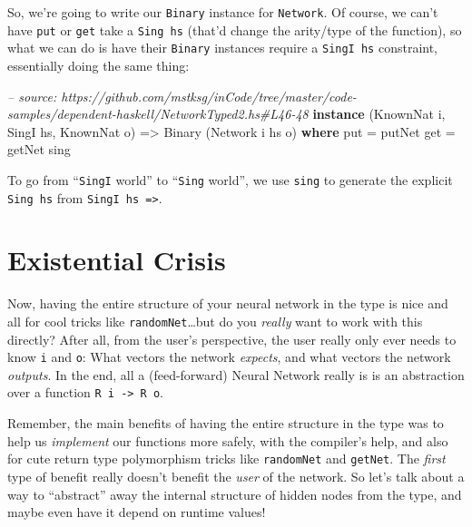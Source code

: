 \documentclass[]{article}
\newenvironment{Shaded}{}{}
\newcommand{\KeywordTok}[1]{\textcolor[rgb]{0.00,0.44,0.13}{\textbf{{#1}}}}
\newcommand{\DataTypeTok}[1]{\textcolor[rgb]{0.56,0.13,0.00}{{#1}}}
\newcommand{\CommentTok}[1]{\textcolor[rgb]{0.38,0.63,0.69}{\textit{{#1}}}}
\newcommand{\OtherTok}[1]{\textcolor[rgb]{0.00,0.44,0.13}{{#1}}}
\newcommand{\FunctionTok}[1]{\textcolor[rgb]{0.02,0.16,0.49}{{#1}}}
\newcommand{\NormalTok}[1]{{#1}}
\begin{document}
So, we're going to write our \texttt{Binary} instance for \texttt{Network}. Of
course, we can't have \texttt{put} or \texttt{get} take a \texttt{Sing\ hs}
(that'd change the arity/type of the function), so what we can do is have their
\texttt{Binary} instances require a \texttt{SingI\ hs} constraint, essentially
doing the same thing:

\begin{Shaded}
\begin{Highlighting}[]
\CommentTok{-- source: https://github.com/mstksg/inCode/tree/master/code-samples/dependent-haskell/NetworkTyped2.hs#L46-48}
\KeywordTok{instance} \NormalTok{(}\DataTypeTok{KnownNat} \NormalTok{i, }\DataTypeTok{SingI} \NormalTok{hs, }\DataTypeTok{KnownNat} \NormalTok{o) }\OtherTok{=>} \DataTypeTok{Binary} \NormalTok{(}\DataTypeTok{Network} \NormalTok{i hs o) }\KeywordTok{where}
    \NormalTok{put }\FunctionTok{=} \NormalTok{putNet}
    \NormalTok{get }\FunctionTok{=} \NormalTok{getNet sing}
\end{Highlighting}
\end{Shaded}

To go from ``\texttt{SingI} world'' to ``\texttt{Sing} world'', we use
\texttt{sing} to generate the explicit \texttt{Sing\ hs} from
\texttt{SingI\ hs\ =\textgreater{}}.

\section{Existential Crisis}\label{existential-crisis}

Now, having the entire structure of your neural network in the type is nice and
all for cool tricks like \texttt{randomNet}\ldots{}but do you \emph{really} want
to work with this directly? After all, from the user's perspective, the user
really only ever needs to know \texttt{i} and \texttt{o}: What vectors the
network \emph{expects}, and what vectors the network \emph{outputs}. In the end,
all a (feed-forward) Neural Network really is is an abstraction over a function
\texttt{R\ i\ -\textgreater{}\ R\ o}.

Remember, the main benefits of having the entire structure in the type was to
help us \emph{implement} our functions more safely, with the compiler's help,
and also for cute return type polymorphism tricks like \texttt{randomNet} and
\texttt{getNet}. The \emph{first} type of benefit really doesn't benefit the
\emph{user} of the network. So let's talk about a way to ``abstract'' away the
internal structure of hidden nodes from the type, and maybe even have it depend
on runtime values!
\end{document}
